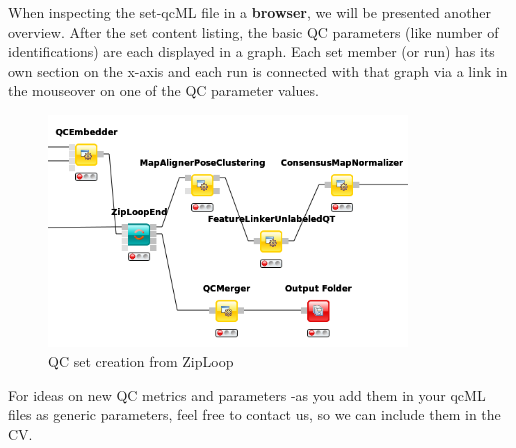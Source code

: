 When inspecting the set-qcML file in a \textbf{browser}, we will be presented another overview. After the set content listing, the basic QC parameters (like number of identifications) are each displayed in a graph. Each set member (or run) has its own section on the x-axis and each run is connected with that graph via a link in the mouseover on one of the QC parameter values.

\newpage

\begin{figure}[htbp]
  \centering
  \includegraphics[width=0.85\textwidth]{graphics/qc/qc_set}
  \caption{QC set creation from ZipLoop}
  \label{fig:qc_set}
\end{figure}


\begin{task}
For ideas on new QC metrics and parameters -as you add them in your qcML files as generic parameters, feel free to contact us, so we can include them in the CV.
\end{task}


